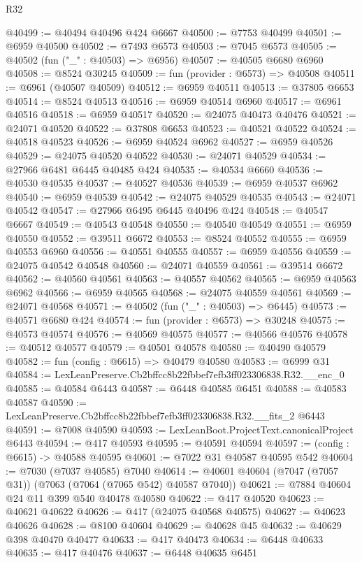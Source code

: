 \begin{lexlean}{R32}
\begin{coremodule}
@40499 := @40494 @40496 @424 @6667
@40500 := @7753 @40499
@40501 := @6959 @40500
@40502 := @7493 @6573
@40503 := @7045 @6573
@40505 := @40502 (fun ("_" : @40503) => @6956)
@40507 := @40505 @6680 @6960
@40508 := @8524 @30245
@40509 := fun (provider : @6573) => @40508
@40511 := @6961 (@40507 @40509)
@40512 := @6959 @40511
@40513 := @37805 @6653
@40514 := @8524 @40513
@40516 := @6959 @40514 @6960
@40517 := @6961 @40516
@40518 := @6959 @40517
@40520 := @24075 @40473 @40476
@40521 := @24071 @40520
@40522 := @37808 @6653
@40523 := @40521 @40522
@40524 := @40518 @40523
@40526 := @6959 @40524 @6962
@40527 := @6959 @40526
@40529 := @24075 @40520 @40522
@40530 := @24071 @40529
@40534 := @27966 @6481 @6445 @40485 @424
@40535 := @40534 @6660
@40536 := @40530 @40535
@40537 := @40527 @40536
@40539 := @6959 @40537 @6962
@40540 := @6959 @40539
@40542 := @24075 @40529 @40535
@40543 := @24071 @40542
@40547 := @27966 @6495 @6445 @40496 @424
@40548 := @40547 @6667
@40549 := @40543 @40548
@40550 := @40540 @40549
@40551 := @6959 @40550
@40552 := @39511 @6672
@40553 := @8524 @40552
@40555 := @6959 @40553 @6960
@40556 := @40551 @40555
@40557 := @6959 @40556
@40559 := @24075 @40542 @40548
@40560 := @24071 @40559
@40561 := @39514 @6672
@40562 := @40560 @40561
@40563 := @40557 @40562
@40565 := @6959 @40563 @6962
@40566 := @6959 @40565
@40568 := @24075 @40559 @40561
@40569 := @24071 @40568
@40571 := @40502 (fun ("_" : @40503) => @6445)
@40573 := @40571 @6680 @424
@40574 := fun (provider : @6573) => @30248
@40575 := @40573 @40574
@40576 := @40569 @40575
@40577 := @40566 @40576
@40578 := @40512 @40577
@40579 := @40501 @40578
@40580 := @40490 @40579
@40582 := fun (config : @6615) => @40479 @40580
@40583 := @6999 @31
@40584 := LexLeanPreserve.Cb2bffcc8b22fbbef7efb3ff023306838.R32.__enc_0
@40585 := @40584 @6443
@40587 := @6448 @40585 @6451
@40588 := @40583 @40587
@40590 := LexLeanPreserve.Cb2bffcc8b22fbbef7efb3ff023306838.R32.__fits_2 @6443
@40591 := @7008 @40590
@40593 := LexLeanBoot.ProjectText.canonicalProject @6443
@40594 := @417 @40593
@40595 := @40591 @40594
@40597 := (config : @6615) -> @40588 @40595
@40601 := @7022 @31 @40587 @40595 @542
@40604 := @7030 (@7037 @40585) @7040
@40614 := @40601 @40604 (@7047 (@7057 @31)) (@7063 (@7064 (@7065 @542) @40587 @7040))
@40621 := @7884 @40604 @24 @11 @399 @540 @40478 @40580
@40622 := @417 @40520
@40623 := @40621 @40622
@40626 := @417 (@24075 @40568 @40575)
@40627 := @40623 @40626
@40628 := @8100 @40604
@40629 := @40628 @45
@40632 := @40629 @398 @40470 @40477
@40633 := @417 @40473
@40634 := @6448 @40633
@40635 := @417 @40476
@40637 := @6448 @40635 @6451

\end{coremodule}
\end{lexlean}
